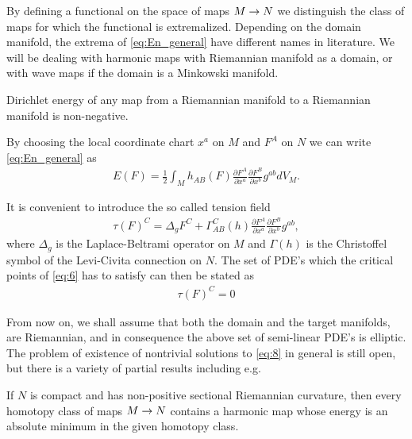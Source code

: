 By defining a functional on the space of maps $M\rightarrow N$ we distinguish
the class of maps for which the functional is extremalized. Depending
on the domain manifold, the extrema of \eqref{eq:En_general} have
different names in literature. We will be dealing with harmonic maps
with Riemannian manifold as a domain, or with wave maps if the domain
is a Minkowski manifold.

\begin{remark}
  Dirichlet energy of any map from a Riemannian manifold to a
  Riemannian manifold is non-negative.
\end{remark}

By choosing the local coordinate chart $x^a$ on $M$ and $F^A$ on $N$
we can write \eqref{eq:En_general} as
\begin{align}
  \label{eq:6}
  E(F)=\frac{1}{2}\int_M h_{AB}(F)\frac{\partial F^A}{\partial
    x^a}\frac{\partial F^B}{\partial x^b}g^{ab}dV_M.
\end{align}

It is convenient to introduce the so called tension field
\begin{align}
  \label{eq:7}
  \tau(F)^C=\Delta_g F^C+\Gamma_{AB}^{C}(h)\frac{\partial
    F^A}{\partial x^a}\frac{\partial F^B}{\partial x^b}g^{ab},
\end{align}
where $\Delta_g$ is the Laplace-Beltrami operator on $M$ and
$\Gamma(h)$ is the Christoffel symbol of the Levi-Civita
connection on $N$. The set of PDE's which the critical points of
\eqref{eq:6} has to satisfy can then be stated as
\begin{align}
  \label{eq:8}
  \tau(F)^C=0
\end{align}

From now on, we shall assume that both the domain
and the target manifolds, are Riemannian, and in consequence the above
set of semi-linear PDE's is elliptic.\\

The problem of existence of nontrivial solutions to \eqref{eq:8} in
general is still open, but there is a variety of partial results
including e.g.

\begin{theorem}\label{thm:Eells-Sampson}
  If $N$ is compact and has non-positive sectional Riemannian
  curvature, then every homotopy class of maps $M\rightarrow N$ contains a
  harmonic map whose energy is an absolute minimum in the given
  homotopy class.
\end{theorem}


